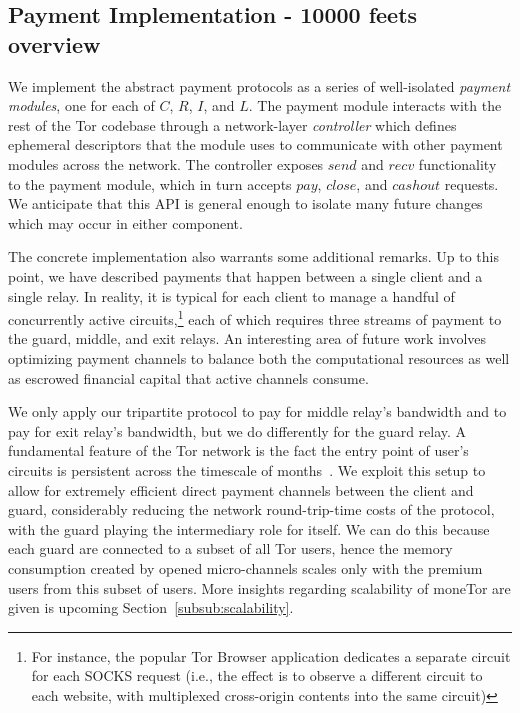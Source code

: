 \subsection{Payment Implementation - 10000 feets overview}

We implement the abstract payment protocols as a series of well-isolated
\emph{payment modules}, one for each of $C$, $R$, $I$, and $L$. The payment
module interacts with the rest of the Tor codebase through a network-layer
\emph{controller} which defines ephemeral descriptors that the module uses to
communicate with other payment modules across the network. The controller
exposes $send$ and $recv$ functionality to the payment module, which in turn
accepts $pay$, $close$, and $cashout$ requests. We anticipate that this API is
general enough to isolate many future changes which may occur in either
component.

The concrete implementation also warrants some additional remarks. Up to this
point, we have described payments that happen between a single client and a
single relay. In reality, it is typical for each client to manage a handful of
concurrently active circuits,\footnote{For instance, the popular Tor Browser
  application dedicates a separate circuit for each SOCKS request (i.e., the effect is to observe a different circuit to each website, with multiplexed cross-origin contents into the same circuit)}
each of which requires three streams of payment to the guard, middle, and exit relays. An interesting area of future work involves optimizing payment channels
to balance both the computational resources as well as escrowed financial
capital that active channels consume.

We only apply our tripartite protocol to pay for middle relay's bandwidth and to pay for exit relay's bandwidth, but we do differently for the guard relay. A fundamental feature of the Tor network is the fact the entry point of user's circuits is persistent
across the timescale of months~\cite{wpes12-cogs}. We exploit this setup to allow for extremely
efficient direct payment channels between the client and guard, considerably
reducing the network round-trip-time costs of the protocol, with the guard playing the intermediary role for itself. We can do this because each guard are connected to a subset of all Tor users, hence the memory consumption created by opened micro-channels scales only with the premium users from this subset of users. More insights regarding scalability of moneTor are given is upcoming Section~\ref{subsub:scalability}.


